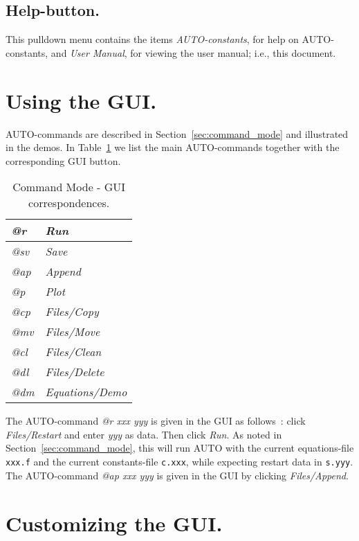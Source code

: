 \documentclass[12pt]{report}
\begin{document}
\subsection{ Help-button.}
This pulldown menu contains the items
{\it {\cal AUTO}-constants}, for help on {\cal AUTO}-constants,
and
{\it User Manual}, for viewing the user manual; i.e., this document.


\section{ Using the GUI.} \label{sec:Using_the_GUI}
{\cal AUTO}-commands are described in Section~\ref{sec:command_mode} and
illustrated in the demos.
In Table~\ref{tbl:CM_GUI} we list the main {\cal AUTO}-commands 
together with the corresponding GUI button.

\begin{table}[htbp]
\begin{center}
\begin{tabular}{| l | l |}
\hline
{\it @r }  & {\it Run} \\  
\hline
{\it @sv }  & {\it Save}  \\ 
\hline
{\it @ap }  & {\it Append} \\ 
\hline
{\it @p }  & {\it Plot}  \\ 
\hline
{\it @cp }  & {\it Files/Copy}  \\ 
\hline
{\it @mv }  & {\it Files/Move}  \\ 
\hline
{\it @cl }  & {\it Files/Clean} \\ 
\hline
{\it @dl }  & {\it Files/Delete} \\  
\hline
{\it @dm }  & {\it Equations/Demo} \\  
\hline
\end{tabular}
\caption{Command Mode - GUI correspondences.}
\label{tbl:CM_GUI}
\end{center}
\end{table}


The {\cal AUTO}-command {\it @r xxx yyy} is given in the GUI as follows~:
click {\it Files/Restart} and enter {\it yyy} as data.
Then click {\it Run}.
As noted in Section~\ref{sec:command_mode}, 
this will run {\cal AUTO} with the current equations-file
{\tt xxx.f} and the current constants-file {\tt c.xxx}, 
while expecting restart data in {\tt s.yyy}.
The {\cal AUTO}-command {\it @ap xxx yyy} is given in the GUI by
clicking {\it Files/Append}.

\section{ Customizing the GUI.} \label{sec:Customizing_the_GUI}
\end{document}

